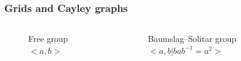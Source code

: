 \documentclass[aspectratio=169]{beamer}
\begin{document}
\begin{frame}
    \frametitle{Grids and Cayley graphs}
    \begin{columns}
        \begin{column}{0.3\textwidth}
            \begin{figure}[ht]\centering
            \caption{Free group $<a, b>$}
            \end{figure}
        \end{column}
        \begin{column}{0.7\textwidth}
            \begin{figure}[ht]\centering
            \caption{Baumslag–Solitar group $<a, b | b a b^{-1} = a^2 >$}
            \end{figure}
        \end{column}
    \end{columns}
\end{frame}
\end{document}
